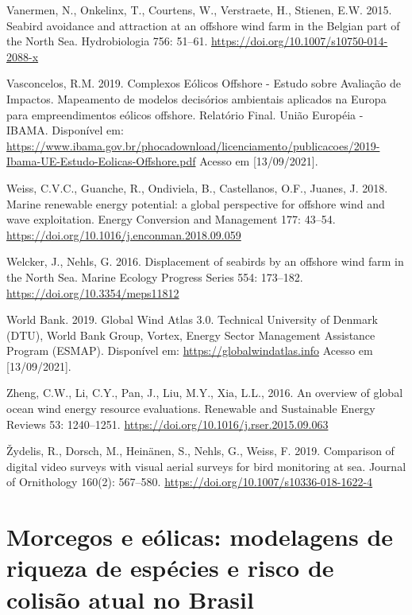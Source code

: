 \documentclass[
  oneside]{scrbook}
\begin{document}
Vanermen, N., Onkelinx, T., Courtens, W., Verstraete, H., Stienen, E.W. 2015. Seabird avoidance and attraction at an offshore wind farm in the Belgian part of the North Sea. Hydrobiologia 756: 51--61. \url{https://doi.org/10.1007/s10750-014-2088-x}

Vasconcelos, R.M. 2019. Complexos Eólicos Offshore - Estudo sobre Avaliação de Impactos. Mapeamento de modelos decisórios ambientais aplicados na Europa para empreendimentos eólicos offshore. Relatório Final. União Européia - IBAMA. Disponível em: \url{https://www.ibama.gov.br/phocadownload/licenciamento/publicacoes/2019-Ibama-UE-Estudo-Eolicas-Offshore.pdf} Acesso em {[}13/09/2021{]}.

Weiss, C.V.C., Guanche, R., Ondiviela, B., Castellanos, O.F., Juanes, J. 2018. Marine renewable energy potential: a global perspective for offshore wind and wave exploitation. Energy Conversion and Management 177: 43--54. \url{https://doi.org/10.1016/j.enconman.2018.09.059}

Welcker, J., Nehls, G. 2016. Displacement of seabirds by an offshore wind farm in the North Sea. Marine Ecology Progress Series 554: 173--182. \url{https://doi.org/10.3354/meps11812}

World Bank. 2019. Global Wind Atlas 3.0. Technical University of Denmark (DTU), World Bank Group, Vortex, Energy Sector Management Assistance Program (ESMAP). Disponível em: \url{https://globalwindatlas.info} Acesso em {[}13/09/2021{]}.

Zheng, C.W., Li, C.Y., Pan, J., Liu, M.Y., Xia, L.L., 2016. An overview of global ocean wind energy resource evaluations. Renewable and Sustainable Energy Reviews 53: 1240--1251. \url{https://doi.org/10.1016/j.rser.2015.09.063}

Žydelis, R., Dorsch, M., Heinänen, S., Nehls, G., Weiss, F. 2019. Comparison of digital video surveys with visual aerial surveys for bird monitoring at sea. Journal of Ornithology 160(2): 567--580. \url{https://doi.org/10.1007/s10336-018-1622-4}

\hypertarget{morcegos-e-euxf3licas-modelagens-de-riqueza-de-espuxe9cies-e-risco-de-colisuxe3o-atual-no-brasil}{%
\chapter{Morcegos e eólicas: modelagens de riqueza de espécies e risco de colisão atual no Brasil}\label{morcegos-e-euxf3licas-modelagens-de-riqueza-de-espuxe9cies-e-risco-de-colisuxe3o-atual-no-brasil}}
\end{document}
